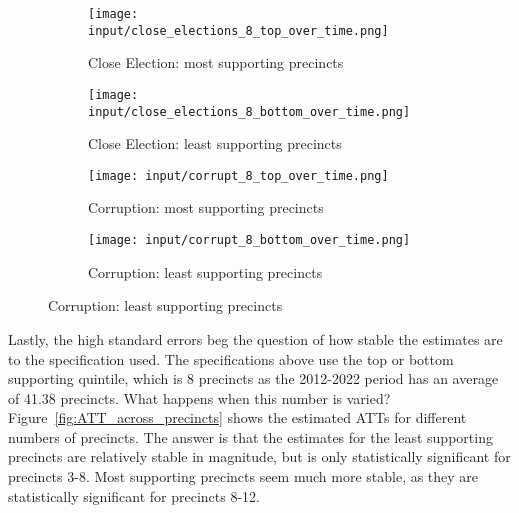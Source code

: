 \begin{figure}[H]
    \centering
    \caption{ATT over time for the four designs}
    \label{fig:ATT_over_time}

    \begin{subfigure}{.48\linewidth}
        \centering
        \texttt{[image: input/close\_elections\_8\_top\_over\_time.png]}
        \caption{Close Election: most supporting precincts}
        \label{fig:ATT_over_time:close_election_top}
    \end{subfigure}\hfill
    \begin{subfigure}{.48\linewidth}
        \centering
        \texttt{[image: input/close\_elections\_8\_bottom\_over\_time.png]}
        \caption{Close Election: least supporting precincts}
        \label{fig:ATT_over_time:close_election_bottom}
    \end{subfigure}

    \begin{subfigure}{.48\linewidth}
        \centering
        \texttt{[image: input/corrupt\_8\_top\_over\_time.png]}
        \caption{Corruption: most supporting precincts}
        \label{fig:ATT_over_time:corruption_bottom}
    \end{subfigure}\hfill
    \begin{subfigure}{.48\linewidth}
        \centering
        \texttt{[image: input/corrupt\_8\_bottom\_over\_time.png]}
        \caption{Corruption: least supporting precincts}
        \label{fig:ATT_over_time:corruption_top}
    \end{subfigure}
\end{figure}

Lastly, the high standard errors beg the question of how stable the estimates are to the specification used.
The specifications above use the top or bottom supporting quintile, which is 8 precincts as the 2012-2022 period has an average of 41.38 precincts. 
What happens when this number is varied?
Figure~\ref{fig:ATT_across_precincts} shows the estimated ATTs for different numbers of precincts. 
The answer is that the estimates for the least supporting precincts are relatively stable in magnitude, but is only statistically significant for precincts 3-8.
Most supporting precincts seem much more stable, as they are statistically significant for precincts 8-12. 

